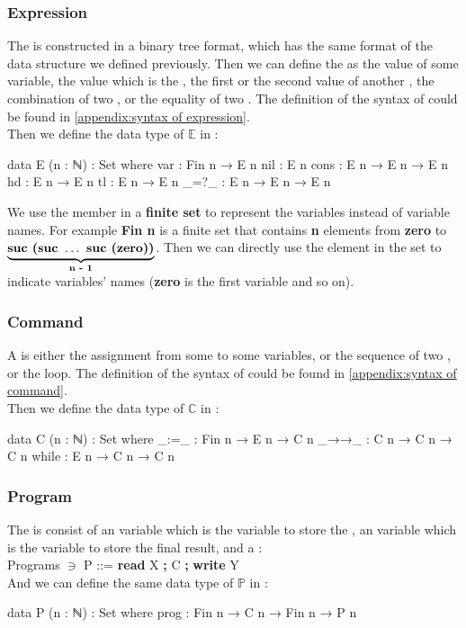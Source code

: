 \subsubsection{Expression}
The  is constructed in a binary tree format, which has the same format of the data structure we defined previously.
Then we can define the  as the value of some variable, the  value which is the , the first or the second value of another , the combination of two , or the equality of two .
The definition of the syntax of  could be found in \ref{appendix:syntax of expression}.\\
Then we define the data type of $\mathds{E}$ in \Agda:
\begin{code}
data E (n : ℕ) : Set where
  var  : Fin n → E n
  nil  : E n
  cons : E n → E n → E n
  hd   : E n → E n
  tl   : E n → E n
  _=?_ : E n → E n → E n
\end{code}
We use the member in a \textbf{finite set} to represent the variables instead of variable names. 
For example \textbf{Fin n} is a finite set that contains \textbf{n} elements from \textbf{zero} to $\underbrace{\mbox{\textbf{suc (suc }} \dots \mbox{\textbf{ suc (zero))}}}_{\textbf{n - 1}}$.
Then we can directly use the element in the set to indicate variables' names (\textbf{zero} is the first variable and so on).
\subsubsection{Command}
A  is either the assignment from some  to some variables, or the sequence of two , or the  loop.
The definition of the syntax of  could be found in \ref{appendix:syntax of command}.\\
Then we define the data type of $\mathds{C}$ in \Agda:
\begin{code}
data C (n : ℕ) : Set where
  _:=_   : Fin n  → E n → C n
  _→→_ : C n → C n → C n
  while  : E n → C n → C n
\end{code}
\subsubsection{Program}
The  is consist of an  variable which is the variable to store the , an  variable which is the variable to store the final result, and a :\\
Programs \hspace{0.5cm}$\ni$\hspace{0.4cm} P\hspace{0.6cm} ::= \textbf{read} X \textbf{;} C \textbf{;} \textbf{write} Y\\
And we can define the same data type of $\mathds{P}$ in \Agda:
\begin{code}
data P (n : ℕ) : Set where
  prog : Fin n → C n → Fin n → P n
\end{code}


